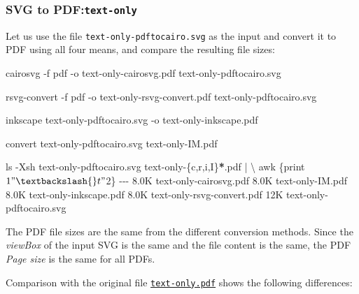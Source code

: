 \documentclass[
  12pt,
  british,
  a4paper,
  rgb,
  dvipsnames,
  svgnames,
  hyphens]{article}
\newenvironment{Shaded}{\begin{snugshade}}{\end{snugshade}}
\newcommand{\AttributeTok}[1]{\textcolor[rgb]{0.80,0.80,0.80}{#1}}
\newcommand{\DataTypeTok}[1]{\textcolor[rgb]{0.87,0.87,0.75}{#1}}
\newcommand{\ExtensionTok}[1]{\textcolor[rgb]{0.80,0.80,0.80}{#1}}
\newcommand{\FunctionTok}[1]{\textcolor[rgb]{0.94,0.94,0.56}{#1}}
\newcommand{\KeywordTok}[1]{\textcolor[rgb]{0.94,0.87,0.69}{#1}}
\newcommand{\NormalTok}[1]{\textcolor[rgb]{0.80,0.80,0.80}{#1}}
\newcommand{\OperatorTok}[1]{\textcolor[rgb]{0.94,0.94,0.82}{#1}}
\newcommand{\PreprocessorTok}[1]{\textcolor[rgb]{1.00,0.81,0.69}{\textbf{#1}}}
\newcommand{\StringTok}[1]{\textcolor[rgb]{0.80,0.58,0.58}{#1}}
\begin{document}
\hypertarget{svg-to-pdftext-only}{%
\subsubsection{\texorpdfstring{SVG to
PDF:\texttt{text-only}}{SVG to PDF:text-only}}\label{svg-to-pdftext-only}}

Let us use the file \texttt{text-only-pdftocairo.svg} as the input and
convert it to PDF using all four means, and compare the resulting file
sizes:

\begin{Shaded}
\begin{Highlighting}[]
\ExtensionTok{cairosvg} \AttributeTok{{-}f}\NormalTok{ pdf }\AttributeTok{{-}o}\NormalTok{ text{-}only{-}cairosvg.pdf text{-}only{-}pdftocairo.svg}

\ExtensionTok{rsvg{-}convert} \AttributeTok{{-}f}\NormalTok{ pdf }\AttributeTok{{-}o}\NormalTok{ text{-}only{-}rsvg{-}convert.pdf text{-}only{-}pdftocairo.svg}

\ExtensionTok{inkscape}\NormalTok{ text{-}only{-}pdftocairo.svg }\AttributeTok{{-}o}\NormalTok{ text{-}only{-}inkscape.pdf}

\ExtensionTok{convert}\NormalTok{ text{-}only{-}pdftocairo.svg text{-}only{-}IM.pdf}

\FunctionTok{ls} \AttributeTok{{-}Xsh}\NormalTok{ text{-}only{-}pdftocairo.svg text{-}only{-}}\DataTypeTok{\{c}\OperatorTok{,}\DataTypeTok{r}\OperatorTok{,}\DataTypeTok{i}\OperatorTok{,}\DataTypeTok{I\}}\PreprocessorTok{*}\NormalTok{.pdf }\KeywordTok{|} \DataTypeTok{\textbackslash{}}
\FunctionTok{awk} \StringTok{\textquotesingle{}\{print $1 "\textbackslash{}t" $2\}\textquotesingle{}}
\ExtensionTok{{-}{-}{-}}
\ExtensionTok{8.0K}\NormalTok{    text{-}only{-}cairosvg.pdf}
\ExtensionTok{8.0K}\NormalTok{    text{-}only{-}IM.pdf}
\ExtensionTok{8.0K}\NormalTok{    text{-}only{-}inkscape.pdf}
\ExtensionTok{8.0K}\NormalTok{    text{-}only{-}rsvg{-}convert.pdf}
\ExtensionTok{12K}\NormalTok{     text{-}only{-}pdftocairo.svg}
\end{Highlighting}
\end{Shaded}

The PDF file sizes are the same from the different conversion methods.
Since the \emph{viewBox} of the input SVG is the same and the file
content is the same, the PDF \emph{Page size} is the same for all PDFs.

Comparison with the original file
\href{images/text-only.pdf}{\texttt{text-only.pdf}} shows the following
differences:
\end{document}
